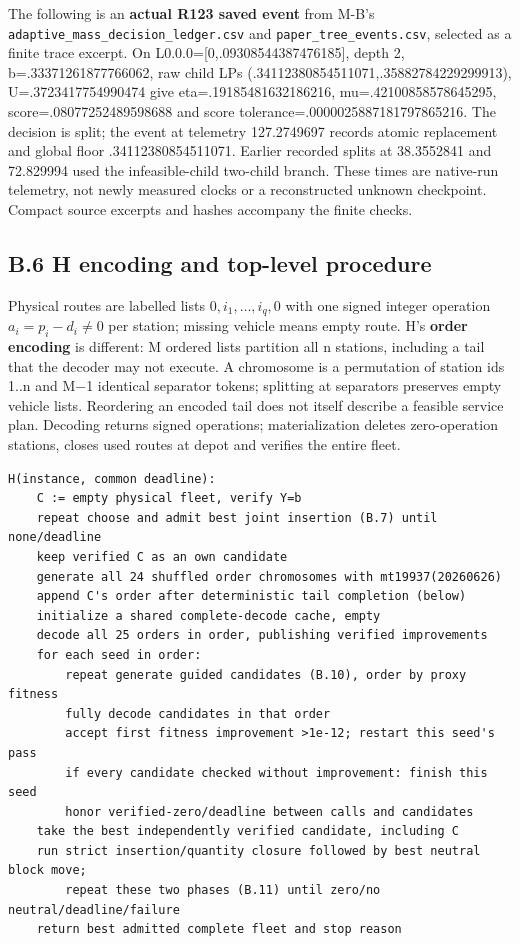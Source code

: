 \documentclass[
  american,
  11pt,
]{article}
\newcounter{none} %
\begin{document}
The following is an \textbf{actual R123 saved event} from M-B's
\texttt{adaptive\_\allowbreak{}mass\_\allowbreak{}decision\_\allowbreak{}ledger.csv} and
\texttt{paper\_\allowbreak{}tree\_\allowbreak{}events.csv}, selected as a finite
trace excerpt. On L0.0.0={[}0,.09308544387476185{]}, depth 2,
b=.33371261877766062, raw child LPs
(.34112380854511071,.35882784229299913), U=.3723417754990474 give
eta=.19185481632186216, mu=.42100858578645295, score=.08077252489598688
and score tolerance=.0000025887181797865216. The decision is split; the
event at telemetry 127.2749697 records atomic replacement and global
floor .34112380854511071. Earlier recorded splits at 38.3552841 and
72.829994 used the infeasible-child two-child branch. These times are
native-run telemetry, not newly measured clocks or a reconstructed
unknown checkpoint. Compact source excerpts and hashes accompany the
finite checks.

\subsection{B.6 H encoding and top-level
procedure}\label{b.6-h-encoding-and-top-level-procedure}

Physical routes are labelled lists \(0,i_1,\ldots,i_q,0\) with one
signed integer operation \(a_i=p_i-d_i\ne0\) per station; missing
vehicle means empty route. H's \textbf{order encoding} is different: M
ordered lists partition all n stations, including a tail that the
decoder may not execute. A chromosome is a permutation of station ids
1..n and M−1 identical separator tokens; splitting at separators
preserves empty vehicle lists. Reordering an encoded tail does not
itself describe a feasible service plan. Decoding returns signed
operations; materialization deletes zero-operation stations, closes used
routes at depot and verifies the entire fleet.

\begin{lstlisting}
H(instance, common deadline):
    C := empty physical fleet, verify Y=b
    repeat choose and admit best joint insertion (B.7) until none/deadline
    keep verified C as an own candidate
    generate all 24 shuffled order chromosomes with mt19937(20260626)
    append C's order after deterministic tail completion (below)
    initialize a shared complete-decode cache, empty
    decode all 25 orders in order, publishing verified improvements
    for each seed in order:
        repeat generate guided candidates (B.10), order by proxy fitness
        fully decode candidates in that order
        accept first fitness improvement >1e-12; restart this seed's pass
        if every candidate checked without improvement: finish this seed
        honor verified-zero/deadline between calls and candidates
    take the best independently verified candidate, including C
    run strict insertion/quantity closure followed by best neutral block move;
        repeat these two phases (B.11) until zero/no neutral/deadline/failure
    return best admitted complete fleet and stop reason
\end{lstlisting}
\end{document}
